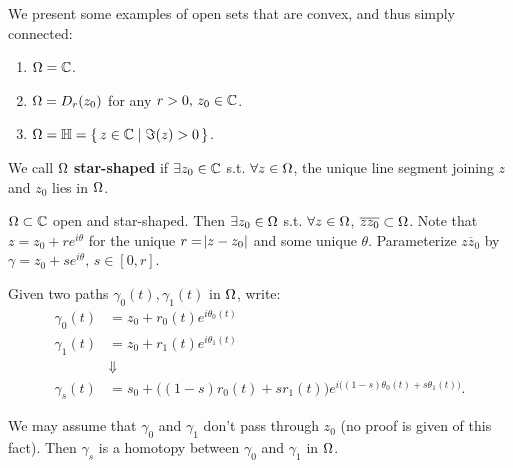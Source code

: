 \begin{example}
We present some examples of open sets that are convex, and thus simply connected:
\begin{enumerate}
    \item $\Omega = \mathbb{C}$.
    \item $\Omega = D_r(z_0)$ for any $r>0, \, z_0 \in \mathbb{C}$.
    \item $\Omega = \mathbb{H} = \set{ z \in \mathbb{C}\mid \Im (z) >0}$.
\end{enumerate}
\end{example}

\begin{definition}

We call $\Omega$ \textbf{star-shaped} if $\exists z_0 \in \mathbb{C}$ s.t. $\forall z \in \Omega$, the unique line segment joining $z$ and $z_0$ lies in $\Omega$.
\end{definition}

\begin{center}
\end{center}

\begin{remark}
$\Omega \subset \mathbb{C}$ open and star-shaped. Then $\exists z_0 \in \Omega$ s.t. $\forall z \in \Omega$, $\overline{z z_0} \subset \Omega$. Note that $z=z_0 + re^{i \theta} $ for the unique $r = \abs{z-z_0}$ and some unique $\theta$. Parameterize $\overline{z z_0}$ by $\gamma = z_0 + s e^{i \theta}, \, s \in [0,r]$.

Given two paths $\gamma_0 (t), \gamma_1 (t)$ in $\Omega$, write:
\begin{align*}
\gamma_0(t) &= z_0 + r_0 (t) e^{i \theta_0 (t)}\\
\gamma_1(t) &= z_0 + r_1 (t) e^{i \theta_1 (t)}\\
&\Downarrow\\
\gamma_s(t) &= s_0 + \big( (1-s)r_0(t) + sr_1(t) \big) e^{i \big( (1-s) \theta_0 (t) + s \theta_1 (t) \big)} .
\end{align*}


We may assume that $\gamma_0$ and $\gamma_1$ don't pass through $z_0$ (no proof is given of this fact). Then $\gamma_s$ is a homotopy between $\gamma_0$ and $\gamma_1$ in $\Omega$.

\end{remark}


